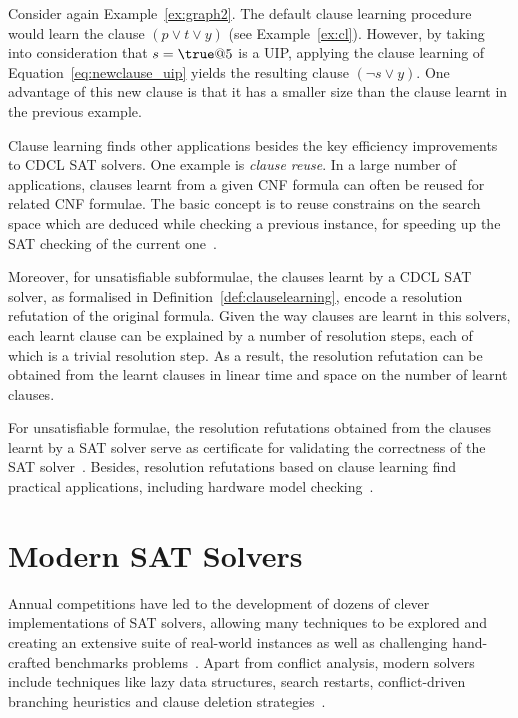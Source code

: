 \begin{example}
    Consider again Example~\ref{ex:graph2}. The default clause learning
    procedure would learn the clause $(p \lor t \lor y)$ (see
    Example~\ref{ex:cl}). However, by taking into consideration that $s =
    \true @5$ is a UIP, applying the clause learning of
    Equation~\ref{eq:newclause_uip} yields the resulting clause $(\neg s \lor
    y)$. One advantage of this new clause is that it has a smaller size than the
    clause learnt in the previous example.
\end{example}

Clause learning finds other applications besides the key efficiency improvements
to CDCL SAT solvers. One example is \emph{clause reuse}. In a large number of
applications, clauses learnt from a given CNF formula can often be reused for
related CNF formulae. The basic concept is to reuse constrains on the search
space which are deduced while checking a previous instance, for speeding up the
SAT checking of the current one~\cite{shtrichman2001pruning}.

Moreover, for unsatisfiable subformulae, the clauses learnt by a CDCL SAT
solver, as formalised in Definition~\ref{def:clauselearning}, encode a
resolution refutation of the original formula. Given the way clauses are learnt
in this solvers, each learnt clause can be explained by a number of resolution
steps, each of which is a trivial resolution step. As a result, the resolution
refutation can be obtained from the learnt clauses in linear time and space on
the number of learnt clauses. 

For unsatisfiable formulae, the resolution refutations obtained from the clauses
learnt by a SAT solver serve as certificate for validating the correctness of
the SAT solver~\cite{cdclchapter}. Besides, resolution refutations based on
clause learning find practical applications, including hardware model
checking~\cite{mcmillan2003interpolation}.

\section{Modern SAT Solvers}%
\label{sec:modern}

Annual competitions have led to the development of dozens of clever
implementations of SAT solvers, allowing many techniques to be explored and
creating an extensive suite of real-world instances as well as challenging
hand-crafted benchmarks problems~\cite{satchapter}. Apart from conflict
analysis, modern solvers include techniques like lazy data structures, search
restarts, conflict-driven branching heuristics and clause deletion
strategies~\cite{cdclchapter}.  

